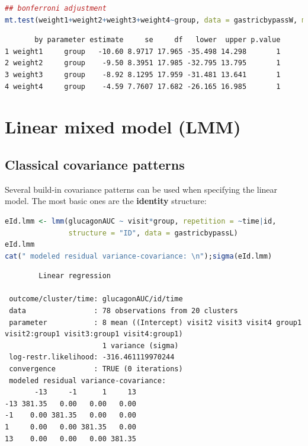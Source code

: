 \documentclass[12pt]{article}
\begin{document}
\begin{lstlisting}[language=r,numbers=none]
## bonferroni adjustment
mt.test(weight1+weight2+weight3+weight4~group, data = gastricbypassW, method = "bonferroni")
\end{lstlisting}

\label{}
\begin{verbatim}
       by parameter estimate     se     df   lower  upper p.value
1 weight1     group   -10.60 8.9717 17.965 -35.498 14.298       1
2 weight2     group    -9.50 8.3951 17.985 -32.795 13.795       1
3 weight3     group    -8.92 8.1295 17.959 -31.481 13.641       1
4 weight4     group    -4.59 7.7607 17.682 -26.165 16.985       1
\end{verbatim}



\clearpage
\section{Linear mixed model (LMM)}
\label{sec:orgece03e2}
\subsection{Classical covariance patterns}
\label{sec:org4e5e03b}

Several build-in covariance patterns can be used when specifying the
linear model. The most basic ones are the \textbf{identity} structure:
\begin{lstlisting}[language=r,numbers=none]
eId.lmm <- lmm(glucagonAUC ~ visit*group, repetition = ~time|id, 
               structure = "ID", data = gastricbypassL)
eId.lmm
cat(" modeled residual variance-covariance: \n");sigma(eId.lmm)
\end{lstlisting}

\label{}
\begin{verbatim}
		Linear regression 

 outcome/cluster/time: glucagonAUC/id/time 
 data                : 78 observations from 20 clusters 
 parameter           : 8 mean ((Intercept) visit2 visit3 visit4 group1 visit2:group1 visit3:group1 visit4:group1) 
                       1 variance (sigma) 
 log-restr.likelihood: -316.461119970244 
 convergence         : TRUE (0 iterations)
 modeled residual variance-covariance: 
       -13     -1      1     13
-13 381.35   0.00   0.00   0.00
-1    0.00 381.35   0.00   0.00
1     0.00   0.00 381.35   0.00
13    0.00   0.00   0.00 381.35
\end{verbatim}
\end{document}
